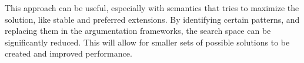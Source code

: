 This approach can be useful, especially with semantics that tries to maximize the solution, like stable and preferred extensions. By identifying certain patterns, and replacing them in the argumentation frameworks, the search space can be significantly reduced. This will allow for smaller sets of possible solutions to be created and improved performance. 
